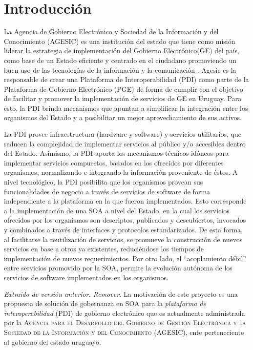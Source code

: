 \chapter{Introducción}
\label{Introduccion}
La Agencia de Gobierno Electrónico y Sociedad de la Información y del Conocimiento (AGESIC) es una institución del estado que tiene como misión liderar la estrategia de implementación del Gobierno Electrónico(GE) del país, como base de un Estado eficiente y centrado en el ciudadano promoviendo un buen uso de las tecnologías de la información y la comunicación \cite{AGESIC:MisionYVision}.
Agesic es la responsable de crear una Plataforma de Interoperabilidad (PDI) como parte de la Plataforma de Gobierno Electrónico (PGE) de forma de cumplir con el objetivo de facilitar y promover la implementación de servicios de GE en Uruguay.
Para esto, la PDI brinda mecanismos que apuntan a simplificar la integración entre los organismos del Estado y a posibilitar un mejor aprovechamiento de sus activos.

La PDI provee infraestructura (hardware y software) y servicios utilitarios, que reducen la complejidad de implementar servicios al público y/o accesibles dentro del Estado. Asimismo, la PDI aporta los mecanismos técnicos idóneos para implementar servicios compuestos, basados en los ofrecidos por diferentes organismos, normalizando e integrando la información proveniente de éstos.
A nivel tecnológico, la PDI posibilita que los organismos provean sus funcionalidades de negocio a través de servicios de software de forma independiente a la plataforma en la que fueron implementados. Esto corresponde a la implementación de una SOA a nivel del Estado, en la cual los servicios ofrecidos por los organismos son descriptos, publicados y descubiertos, invocados y combinados a través de interfaces y protocolos estandarizados.
De esta forma, al facilitarse la reutilización de servicios, se promueve la construcción de nuevos servicios en base a otros ya existentes, reduciéndose los tiempos de implementación de nuevos requerimientos. Por otro lado, el “acoplamiento débil” entre servicios promovido por la SOA, permite la evolución autónoma de los servicios de software implementados en los organismos.\citep{AGESIC:PDI}


\emph{Extraido de versión anterior. Remover.}
La motivación de este proyecto es una propuesta de solución de gobernanza en SOA para la \emph{plataforma de interoperabilidad} (PDI) de gobierno electrónico que es actualmente administrada por la \textsc{Agencia para el Desarrollo del Gobierno de Gestión Electrónica y la Sociedad de la Información y del Conocimiento (AGESIC)}, ente perteneciente al gobierno del estado uruguayo.

